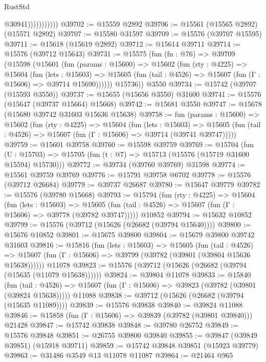 \begin{lexlean}{RustStd}
\begin{coremodule}
                          @30941)))))))))))
@39702 := @15559 @2892
@39706 := @15561 (@15565 @2892) (@15571 @2892)
@39707 := @15580 @31597
@39709 := @15576 (@39707 @15595)
@39711 := @15618 (@15619 @2892)
@39712 := @15614 @39711
@39714 := @15576 (@39712 @15643)
@39731 := @15575
    (fun (fn : @76) =>
    @39709
      (@15598
        (@15601
          (fun (params : @15600) =>
          @15602
            (fun (rty : @4225) =>
            @15604
              (fun (lets : @15603) =>
              @15605 (fun (tail : @4526) => @15607 (fun (Γ : @15606) => @39714 @15690))))))
        @15736))
    @3550
@39734 := @15742 (@39707 (@15593 @3550))
@39737 := @15655 (@15656 @3550) @31600
@39741 := @15576 (@15647 (@39737 @15664) @15668)
@39742 := @15681 @3550
@39747 := @15678 (@15680 @39742 @31603 @15636 @15638)
@39758 := fun (params : @15600) =>
  @15602
    (fun (rty : @4225) =>
    @15604
      (fun (lets : @15603) =>
      @15605 (fun (tail : @4526) => @15607 (fun (Γ : @15606) => @39714 (@39741 @39747)))))
@39759 := @15601 @39758
@39760 := @15598 @39759
@39769 := @15704
    (fun (U : @15703) => @15705 (fun (t : @7) => @15713 (@15576 (@15719 @31600 @15594) @15730)))
@39772 := @39734 (@39760 @39769) @31598
@39774 := @15561 @39759 @39769
@39776 := @15791 @39758 @6702
@39778 := @15576 (@39712 @26684)
@39779 := @39737 @26687
@39780 := @15647 @39779
@39782 := @15576 (@39780 @15668)
@39793 := @15794
    (fun (rty : @4225) =>
    @15604
      (fun (lets : @15603) =>
      @15605 (fun (tail : @4526) => @15607 (fun (Γ : @15606) => @39778 (@39782 @39747)))))
    @10852
@39794 := @15632 @10852
@39799 := @15576 (@39712 (@15626 (@26682 (@39794 @15640))))
@39800 := @15676 @10852
@39801 := @15675 @39800
@39804 := @15679 @39800 @39742 @31603
@39816 := @15816
    (fun (lets : @15603) =>
    @15605
      (fun (tail : @4526) =>
      @15607 (fun (Γ : @15606) => @39799 (@39782 (@39801 (@39804 @15636 @15638))))))
    @11078
@39823 := @15576 (@39712 (@15626 (@26682 (@39794 (@15635 (@11079 @15638))))))
@39824 := @39804 @11078
@39833 := @15840
    (fun (tail : @4526) => @15607 (fun (Γ : @15606) => @39823 (@39782 (@39801 (@39824 @15638)))))
    @11088
@39838 := @39712 (@15626 (@26682 (@39794 (@15635 @11089))))
@39839 := @15576 @39838
@39840 := @39824 @11088
@39846 := @15858 (fun (Γ : @15606) => @39839 (@39782 (@39801 @39840))) @21428
@39847 := @15742 @39838
@39848 := @39780 @26752
@39849 := @15576 @39848
@39851 := @26755 @39800 @39840
@39855 := @39847 (@39849 @39851) (@15918 @39711)
@39859 := @15742 @39848 @39851 (@15923 @39779)
@39863 := @31486 @3549 @13 @11078 @11087
@39864 := @21464 @965

\end{coremodule}
\end{lexlean}

